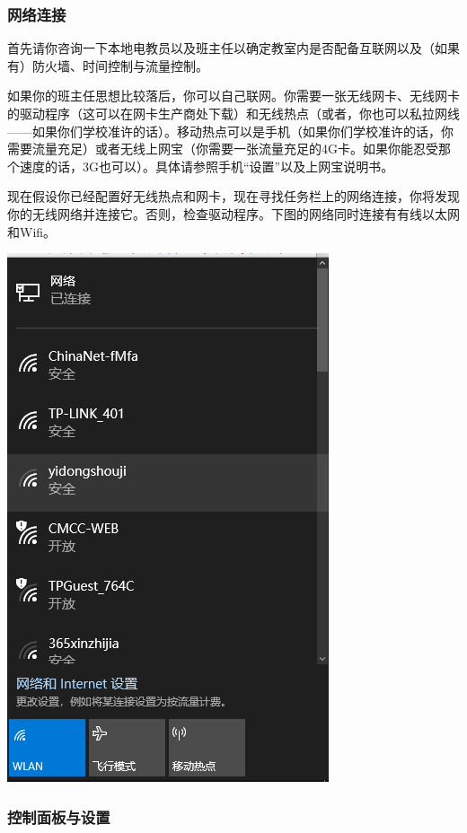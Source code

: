 \subsubsection{网络连接}
首先请你咨询一下本地电教员以及班主任以确定教室内是否配备互联网以及（如果有）防火墙、时间控制与流量控制。\par
如果你的班主任思想比较落后，你可以自己联网。你需要一张无线网卡、无线网卡的驱动程序（这可以在网卡生产商处下载）和无线热点（或者，你也可以私拉网线——如果你们学校准许的话）。移动热点可以是手机（如果你们学校准许的话，你需要流量充足）或者无线上网宝（你需要一张流量充足的4G卡。如果你能忍受那个速度的话，3G也可以）。具体请参照手机“设置”以及上网宝说明书。\par
现在假设你已经配置好无线热点和网卡，现在寻找任务栏上的网络连接，你将发现你的无线网络并连接它。否则，检查驱动程序。下图的网络同时连接有有线以太网和Wifi。
\begin{center}
	\includegraphics[scale=0.8]{pic/wifi}
\end{center} 
\subsubsection{控制面板与设置}
